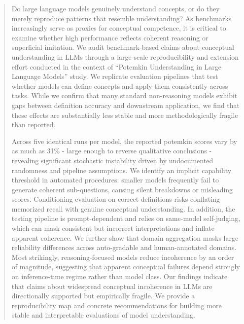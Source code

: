 \documentclass[sigconf,authordraft]{acmart}
\begin{document}
\begin{abstract}

Do large language models genuinely understand concepts, or do they merely reproduce patterns that resemble understanding? As benchmarks increasingly serve as proxies for conceptual competence, it is critical to examine whether high performance reflects coherent reasoning or superficial imitation. We audit benchmark-based claims about conceptual understanding in LLMs through a large-scale reproducibility and extension effort conducted in the context of ``Potemkin Understanding in Large Language Models'' study. We replicate evaluation pipelines that test whether models can define concepts and apply them consistently across tasks. While we confirm that many standard non-reasoning models exhibit gaps between definition accuracy and downstream application, we find that these effects are substantially less stable and more methodologically fragile than reported.

Across five identical runs per model, the reported potemkin scores vary by as much as 31\% - large enough to reverse qualitative conclusions - revealing significant stochastic instability driven by undocumented randomness and pipeline assumptions. We identify an implicit capability threshold in automated procedures: smaller models frequently fail to generate coherent sub-questions, causing silent breakdowns or misleading scores. 
Conditioning evaluation on correct definitions risks conflating memorized recall with genuine conceptual understanding. 
In addition,  the testing pipeline is prompt-dependent and relies on same-model self-judging, which can mask consistent but incorrect interpretations and inflate apparent coherence. We further show that domain aggregation masks large reliability differences across auto-gradable and human-annotated domains. Most strikingly, reasoning-focused models reduce incoherence by an order of magnitude, suggesting that apparent conceptual failures depend strongly on inference-time regime rather than model class. Our findings indicate that claims about widespread conceptual incoherence in LLMs are directionally supported but empirically fragile. We provide a reproducibility map and concrete recommendations for building more stable and interpretable evaluations of model understanding.

\end{abstract}
\end{document}
